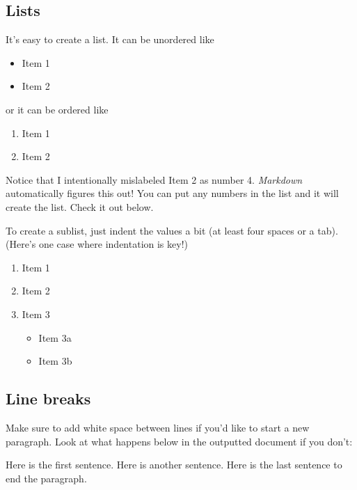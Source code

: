 \documentclass{article}
\providecommand{\tightlist}{\setlength{\itemsep}{0pt}\setlength{\parskip}{0pt}}
\begin{document}
\hypertarget{lists}{%
\subsection{Lists}\label{lists}}

It's easy to create a list. It can be unordered like

\begin{itemize}
\tightlist
\item
  Item 1
\item
  Item 2
\end{itemize}

or it can be ordered like

\begin{enumerate}
\def\labelenumi{\arabic{enumi}.}
\tightlist
\item
  Item 1
\item
  Item 2
\end{enumerate}

Notice that I intentionally mislabeled Item 2 as number 4.
\emph{Markdown} automatically figures this out! You can put any numbers
in the list and it will create the list. Check it out below.

To create a sublist, just indent the values a bit (at least four spaces
or a tab). (Here's one case where indentation is key!)

\begin{enumerate}
\def\labelenumi{\arabic{enumi}.}
\tightlist
\item
  Item 1
\item
  Item 2
\item
  Item 3

  \begin{itemize}
  \tightlist
  \item
    Item 3a
  \item
    Item 3b
  \end{itemize}
\end{enumerate}

\hypertarget{line-breaks}{%
\subsection{Line breaks}\label{line-breaks}}

Make sure to add white space between lines if you'd like to start a new
paragraph. Look at what happens below in the outputted document if you
don't:

Here is the first sentence. Here is another sentence. Here is the last
sentence to end the paragraph.
\end{document}
